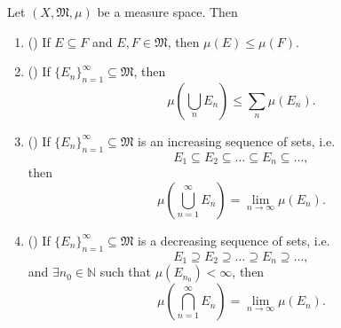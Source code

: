 \documentclass[notoc,notitlepage]{tufte-book}
\begin{document}
\begin{thm}\label{thm:properties_of_a_measure}
  Let $(X, \mathfrak{M}, \mu)$ be a measure space. Then
  \begin{enumerate}
    \item ()
      If $E \subseteq F$ and $E, F \in \mathfrak{M}$,
      then $\mu(E) \leq \mu(F)$.
    \item ()
      If $\{ E_n \}_{n=1}^{\infty} \subseteq \mathfrak{M}$, then
      \begin{equation*}
        \mu \left( \bigcup_{n} E_n \right) \leq \sum_{n} \mu(E_n).
      \end{equation*}
    \item ()
      If $\{ E_n \}_{n=1}^{\infty} \subseteq \mathfrak{M}$ is
      an increasing sequence of sets, i.e.
      \begin{equation*}
        E_1 \subseteq E_2 \subseteq \hdots \subseteq E_n \subseteq \hdots,
      \end{equation*}
      then
      \begin{equation*}
        \mu \left( \bigcup_{n=1}^{\infty} E_n \right)
        = \lim_{n \to \infty} \mu(E_n).
      \end{equation*}
    \item ()
      If $\{ E_n \}_{n=1}^{\infty} \subseteq \mathfrak{M}$ is
      a decreasing sequence of sets, i.e.
      \begin{equation*}
        E_1 \supseteq E_2 \supseteq \hdots \supseteq E_n \supseteq \hdots,
      \end{equation*}
      and $\exists n_0 \in \mathbb{N}$ such that $\mu(E_{n_0}) < \infty$,
      then
      \begin{equation*}
        \mu \left( \bigcap_{n=1}^{\infty} E_n \right)
        = \lim_{n \to \infty} \mu(E_n).
      \end{equation*}
  \end{enumerate}
\end{thm}
\end{document}
